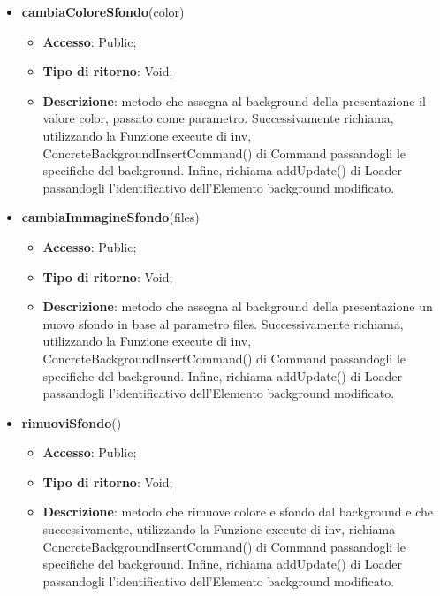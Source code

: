 {{\begin{itemize}
			\begin{itemize}
				\item \textbf{Accesso}: Public;
				\item \textbf{Tipo di ritorno}: Void;
				\item \textbf{Descrizione}: metodo che viene richiamato solo in seguito ad una operazione di undo/redo e che per questo, si occupa solamente di aggiornare il background della presentazione nella view.
			\end{itemize}
			\item \textbf{cambiaColoreSfondo}(color)
			\begin{itemize}
				\item \textbf{Accesso}: Public;
				\item \textbf{Tipo di ritorno}: Void;
				\item \textbf{Descrizione}: metodo che assegna al background della presentazione il valore color, passato come parametro. Successivamente richiama, utilizzando la Funzione execute di inv, ConcreteBackgroundInsertCommand() di Command passandogli le specifiche del background. Infine, richiama addUpdate() di Loader passandogli l'identificativo dell'Elemento background modificato.
			\end{itemize}
			\item \textbf{cambiaImmagineSfondo}(files)
			\begin{itemize}
				\item \textbf{Accesso}: Public;
				\item \textbf{Tipo di ritorno}: Void;
				\item \textbf{Descrizione}: metodo che assegna al background della presentazione un nuovo sfondo in base al parametro files. Successivamente richiama, utilizzando la Funzione execute di inv, ConcreteBackgroundInsertCommand() di Command passandogli le specifiche del background. Infine, richiama addUpdate() di Loader passandogli l'identificativo dell'Elemento background modificato.
			\end{itemize}
			\item \textbf{rimuoviSfondo}()
			\begin{itemize}
				\item \textbf{Accesso}: Public;
				\item \textbf{Tipo di ritorno}: Void;
				\item \textbf{Descrizione}: metodo che rimuove colore e sfondo dal background e che successivamente, utilizzando la Funzione execute di inv, richiama ConcreteBackgroundInsertCommand() di Command passandogli le specifiche del background. Infine, richiama addUpdate() di Loader passandogli l'identificativo dell'Elemento background modificato.

\end{itemize}
\end{itemize}}}

